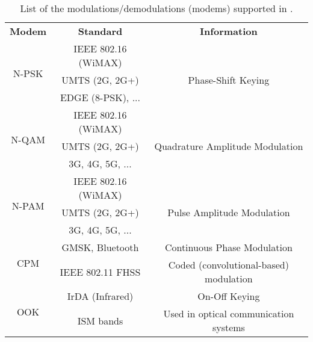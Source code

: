 \begin{table}[htp]
  \centering
  \caption{List of the modulations/demodulations (modems) supported in \AFFECT.}
  \label{tab:aff3ct_features_modems}
  \begin{tabular}{ c | c | c }
  \multirow{2}{*}{\textbf{Modem}} & \multirow{2}{*}{\textbf{Standard}} & \multirow{2}{*}{\textbf{Information}}  \\
                                  &                                    &                                        \\
  \hline
  \hline
  \multirow{3}{*}{{N-PSK}}        & IEEE 802.16 (WiMAX)                &                                        \\
                                  & UMTS (2G, 2G+)                     & Phase-Shift Keying                     \\
                                  & EDGE (8-PSK), ...                  &                                        \\
  \hline
  \multirow{3}{*}{{N-QAM}}        & IEEE 802.16 (WiMAX)                &                                        \\
                                  & UMTS (2G, 2G+)                     & Quadrature Amplitude Modulation        \\
                                  & 3G, 4G, 5G, ...                    &                                        \\
  \hline
  \multirow{3}{*}{{N-PAM}}        & IEEE 802.16 (WiMAX)                &                                        \\
                                  & UMTS (2G, 2G+)                     & Pulse Amplitude Modulation             \\
                                  & 3G, 4G, 5G, ...                    &                                        \\
  \hline
  \multirow{2}{*}{{CPM}}          & GMSK, Bluetooth                    & Continuous Phase Modulation            \\
                                  & IEEE 802.11 FHSS                   & Coded (convolutional-based) modulation \\
  \hline
  \multirow{2}{*}{{OOK}}          & IrDA (Infrared)                    & On-Off Keying                          \\
                                  & ISM bands                          & Used in optical communication systems  \\

\end{tabular}
\end{table}
